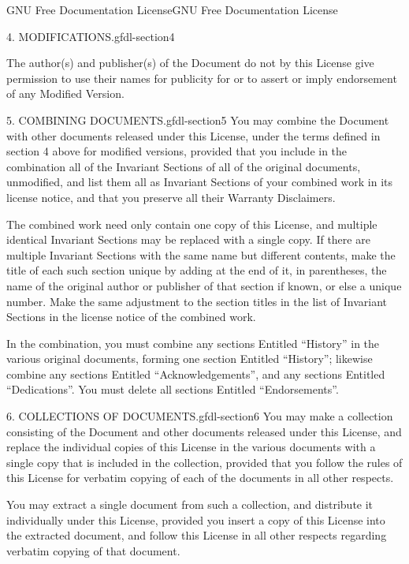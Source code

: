 \documentclass[10pt,]{book}
\numberwithin{equation}{section}
\begin{document}
\begin{appendixptx}{GNU Free Documentation License}{}{GNU Free Documentation License}{}{}
\begin{paragraphs}{4. MODIFICATIONS.}{gfdl-section4}
\par
\hypertarget{p-560}{}%
The author(s) and publisher(s) of the Document do not by this License give permission to use their names for publicity for or to assert or imply endorsement of any Modified Version.%
\end{paragraphs}%
\begin{paragraphs}{5. COMBINING DOCUMENTS.}{gfdl-section5}%
\hypertarget{p-561}{}%
You may combine the Document with other documents released under this License, under the terms defined in section 4 above for modified versions, provided that you include in the combination all of the Invariant Sections of all of the original documents, unmodified, and list them all as Invariant Sections of your combined work in its license notice, and that you preserve all their Warranty Disclaimers.%
\par
\hypertarget{p-562}{}%
The combined work need only contain one copy of this License, and multiple identical Invariant Sections may be replaced with a single copy. If there are multiple Invariant Sections with the same name but different contents, make the title of each such section unique by adding at the end of it, in parentheses, the name of the original author or publisher of that section if known, or else a unique number. Make the same adjustment to the section titles in the list of Invariant Sections in the license notice of the combined work.%
\par
\hypertarget{p-563}{}%
In the combination, you must combine any sections Entitled ``History'' in the various original documents, forming one section Entitled ``History''; likewise combine any sections Entitled ``Acknowledgements'', and any sections Entitled ``Dedications''. You must delete all sections Entitled ``Endorsements''.%
\end{paragraphs}%
\begin{paragraphs}{6. COLLECTIONS OF DOCUMENTS.}{gfdl-section6}%
\hypertarget{p-564}{}%
You may make a collection consisting of the Document and other documents released under this License, and replace the individual copies of this License in the various documents with a single copy that is included in the collection, provided that you follow the rules of this License for verbatim copying of each of the documents in all other respects.%
\par
\hypertarget{p-565}{}%
You may extract a single document from such a collection, and distribute it individually under this License, provided you insert a copy of this License into the extracted document, and follow this License in all other respects regarding verbatim copying of that document.%

\end{paragraphs}
\end{appendixptx}
\end{document}
